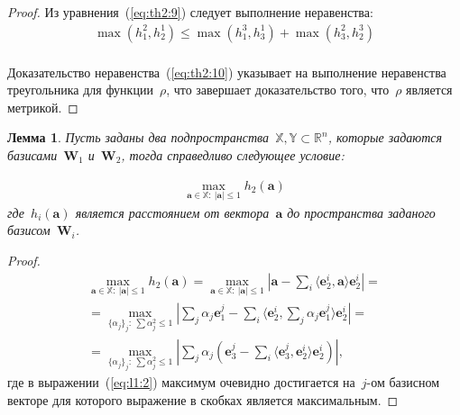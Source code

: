 \documentclass[12pt, twoside]{article}
\newtheorem{lemma}[theorem]{Лемма}
\numberwithin{equation}{section}
\begin{document}
\begin{proof}
Из уравнения~(\ref{eq:th2:9}) следует выполнение неравенства:
\begin{equation}
\label{eq:th2:10}
\begin{aligned}
\max\left(h_{1}^{2}, h_{2}^{1}\right) \leq  \max\left(h_{1}^{3}, h_{3}^{1}\right) + \max\left(h_{3}^{2}, h_{2}^{3}\right)\\
\end{aligned}
\end{equation}

Доказательство неравенства~(\ref{eq:th2:10}) указывает на выполнение неравенства треугольника для функции~$\rho$, что завершает доказательство того, что~$\rho$ является метрикой.

\end{proof}


\begin{lemma} \label{lem:1} 
Пусть заданы два подпространства~$\mathbb{X}, \mathbb{Y} \subset \mathbb{R}^{n}$, которые задаются базисами~$\textbf{W}_1$ и~$\textbf{W}_2$, тогда справедливо следующее условие:

\begin{equation}
\label{eq:l1:1}
\begin{aligned}
\max_{\textbf{a} \in \mathbb{X}:~\left|\textbf{a}\right|\leq 1}h_2\left(\textbf{a}\right)
\end{aligned}
\end{equation}
где~$h_i\left(\textbf{a}\right)$ является расстоянием от вектора~$\textbf{a}$ до пространства заданого базисом~$\textbf{W}_i$.
\end{lemma}

\begin{proof}
\begin{equation}
\label{eq:l1:2}
\begin{aligned}
\max_{\textbf{a} \in \mathbb{X}:~\left|\textbf{a}\right|\leq 1}h_2\left(\textbf{a}\right) = \max_{\textbf{a} \in \mathbb{X}:~\left|\textbf{a}\right|\leq 1}\left|\textbf{a}-\sum_{i}\langle \textbf{e}^i_2, \textbf{a} \rangle\textbf{e}^i_2 \right| = \\ 
=\max_{\{\alpha_j\}_{j}:~\sum\alpha_j^2\leq 1}\left|\sum_{j}\alpha_j\textbf{e}^{j}_1-\sum_{i}\langle \textbf{e}^i_2, \sum_{j}\alpha_j\textbf{e}^{j}_1 \rangle\textbf{e}^i_2 \right| =\\
= \max_{\{\alpha_j\}_{j}:~\sum\alpha_j^2\leq 1}\left|\sum_{j}\alpha_j\left(\textbf{e}_3^j - \sum_{i}\langle\textbf{e}_3^j,\textbf{e}_2^i\rangle\textbf{e}_2^i\right)\right|,
\end{aligned}
\end{equation}
где в выражении~(\ref{eq:l1:2}) максимум очевидно достигается на~$j$-ом базисном векторе для которого выражение в скобках является максимальным.
\end{proof}
\end{document}
